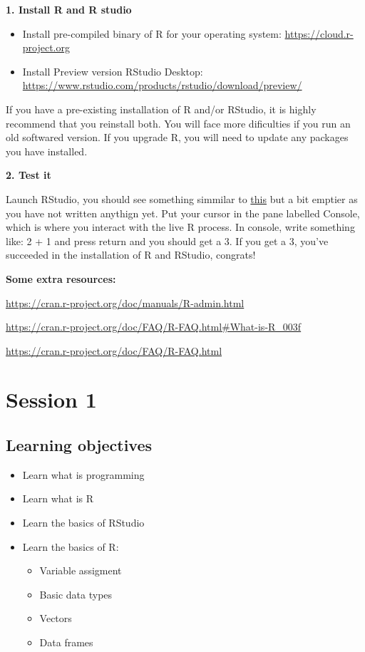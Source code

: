 \documentclass[]{book}
\providecommand{\tightlist}{%
  \setlength{\itemsep}{0pt}\setlength{\parskip}{0pt}}
\theoremstyle{definition}
\theoremstyle{definition}
\theoremstyle{definition}
\theoremstyle{remark}
\begin{document}
\textbf{1. Install R and R studio}

\begin{itemize}
\item
  Install pre-compiled binary of R for your operating system:
  \url{https://cloud.r-project.org}
\item
  Install Preview version RStudio Desktop:
  \url{https://www.rstudio.com/products/rstudio/download/preview/}
\end{itemize}

If you have a pre-existing installation of R and/or RStudio, it is
highly recommend that you reinstall both. You will face more dificulties
if you run an old softwared version. If you upgrade R, you will need to
update any packages you have installed.

\textbf{2. Test it}

Launch RStudio, you should see something simmilar to
\href{https://www.flickr.com/photos/xmodulo/22093054381}{this} but a bit
emptier as you have not written anythign yet. Put your cursor in the
pane labelled Console, which is where you interact with the live R
process. In console, write something like: 2 + 1 and press return and
you should get a 3. If you get a 3, you've succeeded in the installation
of R and RStudio, congrats!

\textbf{Some extra resources:}

\url{https://cran.r-project.org/doc/manuals/R-admin.html}

\url{https://cran.r-project.org/doc/FAQ/R-FAQ.html\#What-is-R_003f}

\url{https://cran.r-project.org/doc/FAQ/R-FAQ.html}

\hypertarget{session-1}{%
\section{Session 1}\label{session-1}}

\hypertarget{learning-objectives}{%
\subsection{Learning objectives}\label{learning-objectives}}

\begin{itemize}
\tightlist
\item
  Learn what is programming
\item
  Learn what is R
\item
  Learn the basics of RStudio
\item
  Learn the basics of R:

  \begin{itemize}
  \tightlist
  \item
    Variable assigment
  \item
    Basic data types
  \item
    Vectors
  \item
    Data frames
  \end{itemize}
\end{itemize}
\end{document}
